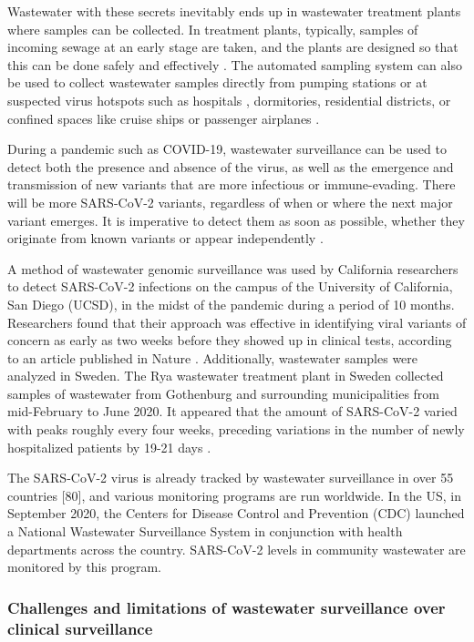         Wastewater with these secrets inevitably ends up in wastewater treatment plants where samples can be collected. In treatment plants, typically, samples of incoming sewage at an early stage are taken, and the plants are designed so that this can be done safely and effectively \cite{foladori2020}. The automated sampling system can also be used to collect wastewater samples directly from pumping stations or at suspected virus hotspots such as hospitals \cite{wang2020}, dormitories, residential districts, or confined spaces like cruise ships or passenger airplanes \cite{ahmed2020}. 
        
        During a pandemic such as COVID-19, wastewater surveillance \cite{new2022,schmidt2020} can be used to detect both the presence and absence of the virus, as well as the emergence and transmission of new variants that are more infectious or immune-evading. There will be more SARS-CoV-2 variants, regardless of when or where the next major variant emerges. It is imperative to detect them as soon as possible, whether they originate from known variants or appear independently \cite{wastewater2022}.  
        
        A method of wastewater genomic surveillance was used by California researchers to detect SARS-CoV-2 infections on the campus of the University of California, San Diego (UCSD), in the midst of the pandemic during a period of 10 months. Researchers found that their approach was effective in identifying viral variants of concern as early as two weeks before they showed up in clinical tests, according to an article published in Nature \cite{karthikeyan2022}. Additionally, wastewater samples were analyzed in Sweden. The Rya wastewater treatment plant in Sweden collected samples of wastewater from Gothenburg and surrounding municipalities from mid-February to June 2020. It appeared that the amount of SARS-CoV-2 varied with peaks roughly every four weeks, preceding variations in the number of newly hospitalized patients by 19-21 days \cite{saguti2021}. 

        The SARS-CoV-2 virus is already tracked by wastewater surveillance in over 55 countries [80], and various monitoring programs are run worldwide. In the US, in September 2020, the Centers for Disease Control and Prevention (CDC) launched a National Wastewater Surveillance System \cite{cdc2022b} in conjunction with health departments across the country. SARS-CoV-2 levels in community wastewater are monitored by this program. 

        \subsubsection{Challenges and limitations of wastewater surveillance over clinical surveillance} 
        
